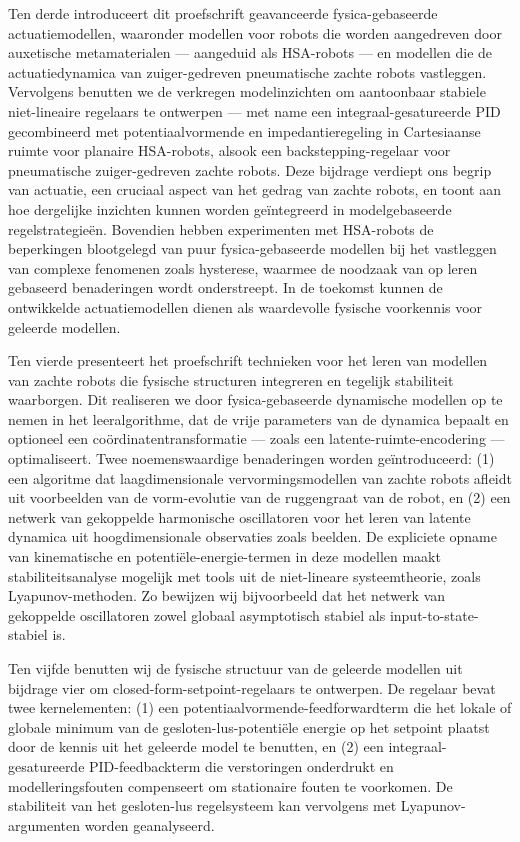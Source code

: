 {Ten derde introduceert dit proefschrift geavanceerde fysica-gebaseerde actuatiemodellen, waaronder modellen voor robots die worden aangedreven door auxetische metamaterialen — aangeduid als HSA-robots — en modellen die de actuatiedynamica van zuiger-gedreven pneumatische zachte robots vastleggen. Vervolgens benutten we de verkregen modelinzichten om aantoonbaar stabiele niet-lineaire regelaars te ontwerpen — met name een integraal-gesatureerde PID gecombineerd met potentiaalvormende en impedantieregeling in Cartesiaanse ruimte voor planaire HSA-robots, alsook een backstepping-regelaar voor pneumatische zuiger-gedreven zachte robots. Deze bijdrage verdiept ons begrip van actuatie, een cruciaal aspect van het gedrag van zachte robots, en toont aan hoe dergelijke inzichten kunnen worden geïntegreerd in modelgebaseerde regelstrategieën. Bovendien hebben experimenten met HSA-robots de beperkingen blootgelegd van puur fysica-gebaseerde modellen bij het vastleggen van complexe fenomenen zoals hysterese, waarmee de noodzaak van op leren gebaseerd benaderingen wordt onderstreept. In de toekomst kunnen de ontwikkelde actuatiemodellen dienen als waardevolle fysische voorkennis voor geleerde modellen.

Ten vierde presenteert het proefschrift technieken voor het leren van modellen van zachte robots die fysische structuren integreren en tegelijk stabiliteit waarborgen. Dit realiseren we door fysica-gebaseerde dynamische modellen op te nemen in het leeralgorithme, dat de vrije parameters van de dynamica bepaalt en optioneel een coördinatentransformatie — zoals een latente-ruimte-encodering — optimaliseert. Twee noemenswaardige benaderingen worden geïntroduceerd: (1) een algoritme dat laagdimensionale vervormingsmodellen van zachte robots afleidt uit voorbeelden van de vorm-evolutie van de ruggengraat van de robot, en (2) een netwerk van gekoppelde harmonische oscillatoren voor het leren van latente dynamica uit hoogdimensionale observaties zoals beelden. De expliciete opname van kinematische en potentiële-energie-termen in deze modellen maakt stabiliteitsanalyse mogelijk met tools uit de niet-lineare systeemtheorie, zoals Lyapunov-methoden. Zo bewijzen wij bijvoorbeeld dat het netwerk van gekoppelde oscillatoren zowel globaal asymptotisch stabiel als input-to-state-stabiel is.

Ten vijfde benutten wij de fysische structuur van de geleerde modellen uit bijdrage vier om closed-form-setpoint-regelaars te ontwerpen. De regelaar bevat twee kernelementen: (1) een potentiaalvormende-feedforwardterm die het lokale of globale minimum van de gesloten-lus-potentiële energie op het setpoint plaatst door de kennis uit het geleerde model te benutten, en (2) een integraal-gesatureerde PID-feedbackterm die verstoringen onderdrukt en modelleringsfouten compenseert om stationaire fouten te voorkomen. De stabiliteit van het gesloten-lus regelsysteem kan vervolgens met Lyapunov-argumenten worden geanalyseerd.

}
